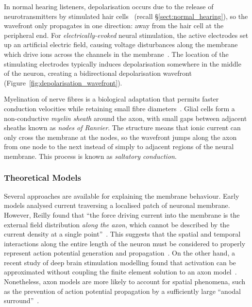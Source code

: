 In normal hearing listeners, depolarisation occurs due to the release of
neurotransmitters by stimulated hair cells~\cite{brown2001,martini2006} (recall
\S\ref{sect:normal_hearing}), so the wavefront only propagates in one direction:
away from the hair cell at the peripheral end. For \emph{electrically-evoked}
neural stimulation, the active electrodes set up an artificial electric
field, causing voltage disturbances along the membrane which drive ions across
the channels in the membrane~\cite{reilly1998}. The location of the stimulating
electrodes typically induces depolarisation somewhere in the middle of the
neuron, creating a bidirectional depolarisation wavefront
(Figure~\ref{fig:depolarisation_wavefront}).

Myelination of nerve fibres is a biological adaptation that permits faster
conduction velocities while retaining small fibre diameters~\cite{brown2001}.
Glial cells form a non-conductive \emph{myelin sheath} around the axon, with
small gaps between adjacent sheaths known as \emph{nodes of Ranvier}. The
structure means that ionic current can only cross the membrane at the nodes, so
the wavefront jumps along the axon from one node to the next instead of simply
to adjacent regions of the neural membrane. This process is known as
\emph{saltatory conduction}.

\subsubsection{Theoretical Models}

Several approaches are available for explaining the membrane behaviour. Early
models analysed current traversing a localised patch of neuronal membrane.
However, Reilly found that ``the force driving current into the membrane is the
external field distribution \emph{along the axon}, which cannot be described by
the current density at a single point''~\cite{reilly1998}. This suggests that
the spatial and temporal interactions along the entire length of the neuron must
be considered to properly represent action potential generation and
propagation~\cite{strelioff1973,rattay1990,reilly1998,astrom2014}. On the other
hand, a recent study of deep brain stimulation modelling found that activation
can be approximated without coupling the finite element solution to an axon
model~\cite{astrom2014}. Nonetheless, axon models are more likely to account for
spatial phenomena, such as the prevention of action potential propagation by a
sufficiently large ``anodal surround''~\cite{ranck1975}.

